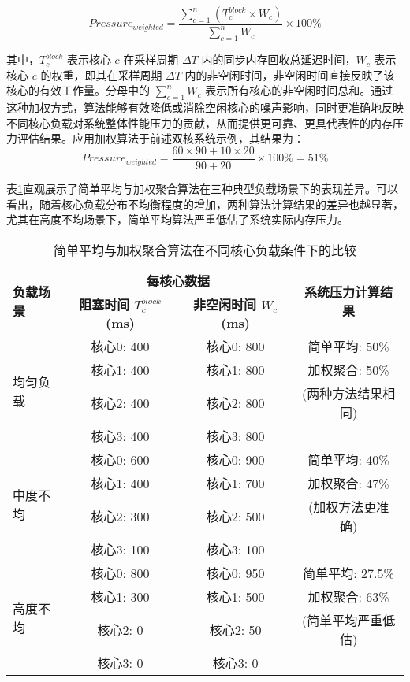 \begin{equation}
    \label{eq:weighted_aggregation}
    Pressure_{weighted} = \frac{\sum_{c=1}^{n} (T_c^{block} \times W_c)}{\sum_{c=1}^{n} W_c} \times 100\%
\end{equation}

其中，\(T_c^{block}\) 表示核心 \(c\) 在采样周期 \(\Delta T\) 内的同步内存回收总延迟时间，\(W_c\) 表示核心 \(c\) 的权重，即其在采样周期 \(\Delta T\) 内的非空闲时间，非空闲时间直接反映了该核心的有效工作量。分母中的 \(\sum_{c=1}^{n} W_c\) 表示所有核心的非空闲时间总和。通过这种加权方式，算法能够有效降低或消除空闲核心的噪声影响，同时更准确地反映不同核心负载对系统整体性能压力的贡献，从而提供更可靠、更具代表性的内存压力评估结果。应用加权算法于前述双核系统示例，其结果为：
\[
Pressure_{weighted} = \frac{60 \times 90 + 10 \times 20}{90 + 20} \times 100\% = 51\%
\]

表\ref{tab:weighted_vs_simple}直观展示了简单平均与加权聚合算法在三种典型负载场景下的表现差异。可以看出，随着核心负载分布不均衡程度的增加，两种算法计算结果的差异也越显著，尤其在高度不均场景下，简单平均算法严重低估了系统实际内存压力。

\begin{table}[htbp]
    \centering
    \caption{简单平均与加权聚合算法在不同核心负载条件下的比较}
    \label{tab:weighted_vs_simple}
    \begin{tabular}{lccc}
        \toprule
        \multirow{2}{*}{\textbf{负载场景}} & \multicolumn{2}{c}{\textbf{每核心数据}} & \multirow{2}{*}{\textbf{系统压力计算结果}} \\
        \cmidrule(lr){2-3}
         & \textbf{阻塞时间 $T_c^{block}$ (ms)} & \textbf{非空闲时间 $W_c$ (ms)} & \\
        \midrule
        \multirow{4}{*}{均匀负载} & 核心0: 400 & 核心0: 800 & 简单平均: 50\% \\
         & 核心1: 400 & 核心1: 800 & 加权聚合: 50\% \\
         & 核心2: 400 & 核心2: 800 & (两种方法结果相同) \\
         & 核心3: 400 & 核心3: 800 & \\
        \midrule
        \multirow{4}{*}{中度不均} & 核心0: 600 & 核心0: 900 & 简单平均: 40\% \\
         & 核心1: 400 & 核心1: 700 & 加权聚合: 47\% \\
         & 核心2: 300 & 核心2: 500 & (加权方法更准确) \\
         & 核心3: 100 & 核心3: 100 & \\
        \midrule
        \multirow{4}{*}{高度不均} & 核心0: 800 & 核心0: 950 & 简单平均: 27.5\% \\
         & 核心1: 300 & 核心1: 500 & 加权聚合: 63\% \\
         & 核心2: 0 & 核心2: 50 & (简单平均严重低估) \\
         & 核心3: 0 & 核心3: 0 & \\
        \bottomrule
    \end{tabular}
\end{table}



